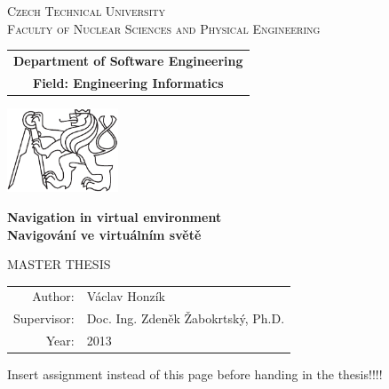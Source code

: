 \documentclass[a4paper,12pt,twoside]{report}
\newcommand{\cvut}{Czech Technical University}
\newcommand{\fjfi}{Faculty of Nuclear Sciences and Physical Engineering}
\newcommand{\kse}{Department of Software Engineering}
\newcommand{\obor}{Engineering Informatics}
\newcommand{\nazevcz}{Navigování ve virtuálním světě}        %
\newcommand{\nazeven}{Navigation in virtual environment}     %
\newcommand{\autor}{Václav Honzík}           %
\newcommand{\rok}{2013}                %
\newcommand{\vedouci}{Doc. Ing. Zdeněk Žabokrtský, Ph.D.}         %
\begin{document}
\thispagestyle{empty}

\begin{center}
    {\Large \textsc{\cvut}\\[1.5ex] \textsc{\fjfi}}\\
    \vspace{10mm}
    
    \begin{tabular}{c}
	    {\bf \kse}\\   
      {\bf Field: \obor}\\
    \end{tabular}


   \vspace{10mm} \includegraphics[height=25mm]{cvut-logo-bw} \vspace{15mm}
 

   {\huge \bf \nazeven}\\
   \vspace{5mm}   
   {\huge \bf \nazevcz}

   \vspace{15mm}
   {\Large MASTER THESIS}

   \vfill
   {\large
    \begin{tabular}{rl}
    Author: & \autor\\
    Supervisor: & \vedouci\\
    Year: & \rok
    \end{tabular}
   }
\end{center}

\newpage  %
\thispagestyle{empty} Insert assignment instead of this page before handing in the thesis!!!!
\end{document}
